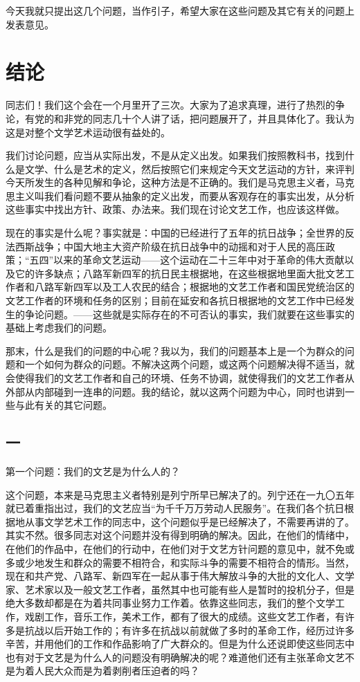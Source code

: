 今天我就只提出这几个问题，当作引子，希望大家在这些问题及其它有关的问题上发表意见。

\date{一九四二年五月二十三日}
\section{结论}

同志们！我们这个会在一个月里开了三次。大家为了追求真理，进行了热烈的争论，有党的和非党的同志几十个人讲了话，把问题展开了，并且具体化了。我认为这是对整个文学艺术运动很有益处的。

我们讨论问题，应当从实际出发，不是从定义出发。如果我们按照教科书，找到什么是文学、什么是艺术的定义，然后按照它们来规定今天文艺运动的方针，来评判今天所发生的各种见解和争论，这种方法是不正确的。我们是马克思主义者，马克思主义叫我们看问题不要从抽象的定义出发，而要从客观存在的事实出发，从分析这些事实中找出方针、政策、办法来。我们现在讨论文艺工作，也应该这样做。

现在的事实是什么呢？事实就是：中国的已经进行了五年的抗日战争；全世界的反法西斯战争；中国大地主大资产阶级在抗日战争中的动摇和对于人民的高压政策；“五四”以来的革命文艺运动——这个运动在二十三年中对于革命的伟大贡献以及它的许多缺点；八路军新四军的抗日民主根据地，在这些根据地里面大批文艺工作者和八路军新四军以及工人农民的结合；根据地的文艺工作者和国民党统治区的文艺工作者的环境和任务的区别；目前在延安和各抗日根据地的文艺工作中已经发生的争论问题。——这些就是实际存在的不可否认的事实，我们就要在这些事实的基础上考虑我们的问题。

那末，什么是我们的问题的中心呢？我以为，我们的问题基本上是一个为群众的问题和一个如何为群众的问题。不解决这两个问题，或这两个问题解决得不适当，就会使得我们的文艺工作者和自己的环境、任务不协调，就使得我们的文艺工作者从外部从内部碰到一连串的问题。我的结论，就以这两个问题为中心，同时也讲到一些与此有关的其它问题。

\subsection*{一}

第一个问题：我们的文艺是为什么人的？

这个问题，本来是马克思主义者特别是列宁所早已解决了的。列宁还在一九〇五年就已着重指出过，我们的文艺应当“为千千万万劳动人民服务”。在我们各个抗日根据地从事文学艺术工作的同志中，这个问题似乎是已经解决了，不需要再讲的了。其实不然。很多同志对这个问题并没有得到明确的解决。因此，在他们的情绪中，在他们的作品中，在他们的行动中，在他们对于文艺方针问题的意见中，就不免或多或少地发生和群众的需要不相符合，和实际斗争的需要不相符合的情形。当然，现在和共产党、八路军、新四军在一起从事于伟大解放斗争的大批的文化人、文学家、艺术家以及一般文艺工作者，虽然其中也可能有些人是暂时的投机分子，但是绝大多数却都是在为着共同事业努力工作着。依靠这些同志，我们的整个文学工作，戏剧工作，音乐工作，美术工作，都有了很大的成绩。这些文艺工作者，有许多是抗战以后开始工作的；有许多在抗战以前就做了多时的革命工作，经历过许多辛苦，并用他们的工作和作品影响了广大群众的。但是为什么还说即使这些同志中也有对于文艺是为什么人的问题没有明确解决的呢？难道他们还有主张革命文艺不是为着人民大众而是为着剥削者压迫者的吗？

